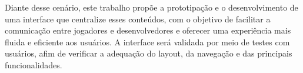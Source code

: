 Diante desse cenário, este trabalho propõe a prototipação e o desenvolvimento de uma interface que centralize esses conteúdos, com o objetivo de facilitar a comunicação entre jogadores e desenvolvedores e oferecer uma experiência mais fluida e eficiente aos usuários. A interface será validada por meio de testes com usuários, afim de verificar a adequação do layout, da navegação e das principais funcionalidades.


